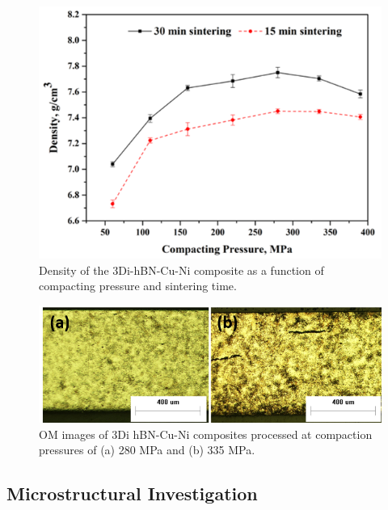 \begin{figure}[!htb]
\centering
\includegraphics[scale=1.0]{graphics/chapter_2/Pressure-density relationship-1}
\caption{Density of the 3Di-hBN-Cu-Ni composite as a function of compacting pressure and sintering time.}
\label{fig:pressure_density}
\end{figure}

\begin{figure}[!htb]
\centering
\includegraphics [width=\linewidth]{graphics/chapter_2/OM_image (HC)}
\caption{OM images of 3Di hBN-Cu-Ni composites processed at compaction pressures of (a) 280 MPa and (b) 335 MPa.}
\label{fig:ununiform_interior}
\end{figure}
\subsection{Microstructural Investigation}

